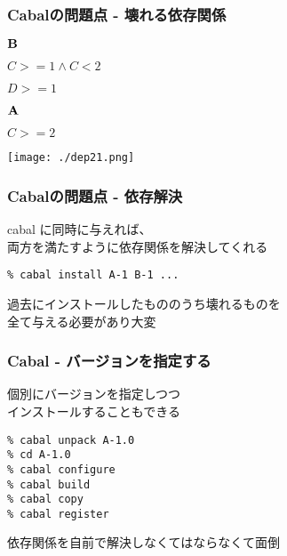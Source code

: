 \documentclass[cjk,dvipdfm,14pt]{beamer}
\begin{document}
\begin{frame}
\frametitle{Cabalの問題点 - 壊れる依存関係}

\begin{description}
\item ${\bf B}$
\item
  \begin{description}
  \item $C >= 1 \wedge C < 2$
  \item $D >= 1$
  \end{description}
\end{description}

\begin{description}
\item ${\bf A}$
\item
  \begin{description}
  \item $C >= 2$
  \end{description}
\end{description}

\texttt{[image: ./dep21.png]}

\end{frame}

\begin{frame}[fragile]
\frametitle{Cabalの問題点 - 依存解決}

cabal に同時に与えれば、\\両方を満たすように依存関係を解決してくれる

\begin{lstlisting}
% cabal install A-1 B-1 ...
\end{lstlisting}

過去にインストールしたもののうち壊れるものを\\全て与える必要があり大変

\end{frame}


\begin{frame}[fragile]
\frametitle{Cabal - バージョンを指定する}

個別にバージョンを指定しつつ\\インストールすることもできる

\begin{lstlisting}
% cabal unpack A-1.0
% cd A-1.0
% cabal configure
% cabal build
% cabal copy
% cabal register
\end{lstlisting}

依存関係を自前で解決しなくてはならなくて面倒

\end{frame}
\end{document}
